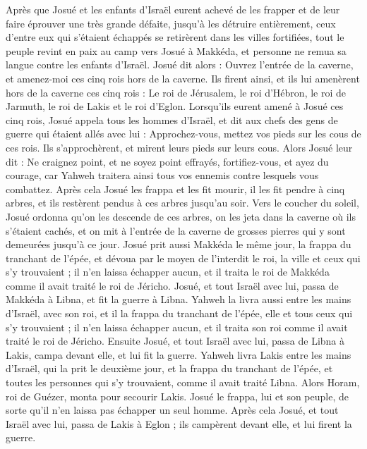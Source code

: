 \begin{multicols}{2}
Après que Josué et les enfants d’Israël eurent achevé de les frapper et de leur faire éprouver une très grande défaite, jusqu’à les détruire entièrement, ceux d’entre eux qui s’étaient échappés se retirèrent dans les villes fortifiées,
tout le peuple revint en paix au camp vers Josué à Makkéda, et personne ne remua sa langue contre les enfants d’Israël.
Josué dit alors : Ouvrez l’entrée de la caverne, et amenez-moi ces cinq rois hors de la caverne.
Ils firent ainsi, et ils lui amenèrent hors de la caverne ces cinq rois : Le roi de Jérusalem, le roi d’Hébron, le roi de Jarmuth, le roi de Lakis et le roi d’Eglon.
Lorsqu’ils eurent amené à Josué ces cinq rois, Josué appela tous les hommes d’Israël, et dit aux chefs des gens de guerre qui étaient allés avec lui : Approchez-vous, mettez vos pieds sur les cous de ces rois. Ils s’approchèrent, et mirent leurs pieds sur leurs cous.
Alors Josué leur dit : Ne craignez point, et ne soyez point effrayés, fortifiez-vous, et ayez du courage, car Yahweh traitera ainsi tous vos ennemis contre lesquels vous combattez.
Après cela Josué les frappa et les fit mourir, il les fit pendre à cinq arbres, et ils restèrent pendus à ces arbres jusqu’au soir.
Vers le coucher du soleil, Josué ordonna qu’on les descende de ces arbres, on les jeta dans la caverne où ils s’étaient cachés, et on mit à l’entrée de la caverne de grosses pierres qui y sont demeurées jusqu’à ce jour.
Josué prit aussi Makkéda le même jour, la frappa du tranchant de l’épée, et dévoua par le moyen de l'interdit le roi, la ville et ceux qui s’y trouvaient ; il n’en laissa échapper aucun, et il traita le roi de Makkéda comme il avait traité le roi de Jéricho.
Josué, et tout Israël avec lui, passa de Makkéda à Libna, et fit la guerre à Libna.
Yahweh la livra aussi entre les mains d’Israël, avec son roi, et il la frappa du tranchant de l’épée, elle et tous ceux qui s’y trouvaient ; il n’en laissa échapper aucun, et il traita son roi comme il avait traité le roi de Jéricho.
Ensuite Josué, et tout Israël avec lui, passa de Libna à Lakis, campa devant elle, et lui fit la guerre.
Yahweh livra Lakis entre les mains d’Israël, qui la prit le deuxième jour, et la frappa du tranchant de l’épée, et toutes les personnes qui s’y trouvaient, comme il avait traité Libna.
Alors Horam, roi de Guézer, monta pour secourir Lakis. Josué le frappa, lui et son peuple, de sorte qu’il n’en laissa pas échapper un seul homme.
Après cela Josué, et tout Israël avec lui, passa de Lakis à Eglon ; ils campèrent devant elle, et lui firent la guerre.

\end{multicols}
